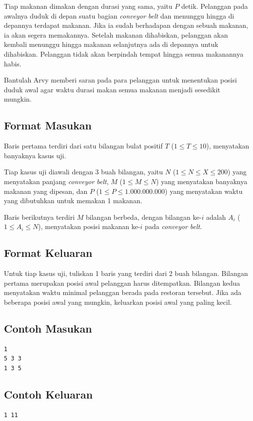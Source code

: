 \documentclass{article}
\begin{document}
Tiap makanan dimakan dengan durasi yang sama, yaitu $P$ detik.
Pelanggan pada awalnya duduk di depan suatu bagian \textit{conveyor belt} dan menunggu hingga di depannya terdapat makanan.
Jika ia sudah berhadapan dengan sebuah makanan, ia akan segera memakannya.
Setelah makanan dihabiskan, pelanggan akan kembali menunggu hingga makanan selanjutnya ada di depannya untuk dihabiskan.
Pelanggan tidak akan berpindah tempat hingga semua makanannya habis.

Bantulah Arvy memberi saran pada para pelanggan untuk menentukan posisi duduk awal agar waktu durasi makan semua makanan menjadi sesedikit mungkin.

\subsection*{Format Masukan}

Baris pertama terdiri dari satu bilangan bulat positif $T$ ($1 \leq T \leq 10$), menyatakan banyaknya kasus uji.

Tiap kasus uji diawali dengan 3 buah bilangan, yaitu $N$ ($1 \leq N \leq X \leq 200$) yang menyatakan panjang \textit{conveyor belt}, $M$ ($1 \leq M \leq N$) yang menyatakan banyaknya makanan yang dipesan, dan $P$ ($1 \leq P \leq 1.000.000.000$) yang menyatakan waktu yang dibutuhkan untuk memakan 1 makanan.

Baris berikutnya terdiri $M$ bilangan berbeda, dengan bilangan ke-$i$ adalah $A_i$ ($1 \leq A_i \leq N$), menyatakan posisi makanan ke-$i$ pada \textit{conveyor belt}.

\subsection*{Format Keluaran}

Untuk tiap kasus uji, tuliskan 1 baris yang terdiri dari 2 buah bilangan.
Bilangan pertama merupakan posisi awal pelanggan harus ditempatkan.
Bilangan kedua menyatakan waktu minimal pelanggan berada pada restoran tersebut.
Jika ada beberapa posisi awal yang mungkin, keluarkan posisi awal yang paling kecil.
\\

\begin{multicols}{2}
\subsection*{Contoh Masukan}
\begin{lstlisting}
1
5 3 3
1 3 5
\end{lstlisting}
\columnbreak
\subsection*{Contoh Keluaran}
\begin{lstlisting}
1 11
\end{lstlisting}
\vfill
\null
\end{multicols}
\end{document}
